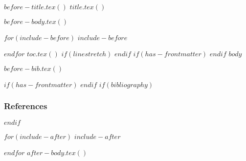 $before-title.tex()$
$title.tex()$




$before-body.tex()$

$for(include-before)$
$include-before$

$endfor$
$toc.tex()$
$if(linestretch)$
$endif$
$if(has-frontmatter)$
\mainmatter
$endif$
$body$

$before-bib.tex()$

$if(has-frontmatter)$
\backmatter
$endif$
$if(bibliography)$
    \begin{frame}[allowframebreaks]
        \frametitle{References}
            {
            }
    \end{frame}
$endif$

$for(include-after)$
$include-after$

$endfor$
$after-body.tex()$

